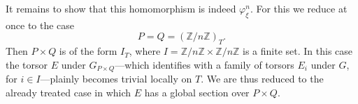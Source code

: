 It remains to show that this homomorphism is indeed $\varphi_\xi^n$.
For this we reduce at once to the case
\[
 P=Q=(\mathbb Z/n\mathbb Z)_T.
\]
Then $P\times Q$ is of the form $I_T$, where
$I=\mathbb Z/n\mathbb Z\times\mathbb Z/n\mathbb Z$ is a finite set.
In this case the torsor $E$ under $G_{P\times Q}$---which identifies
with a family of torsors $E_i$ under $G$, for $i\in I$---plainly
becomes trivial locally on $T$.  We are thus reduced to the already
treated case in which $E$ has a global section over $P\times Q$.

